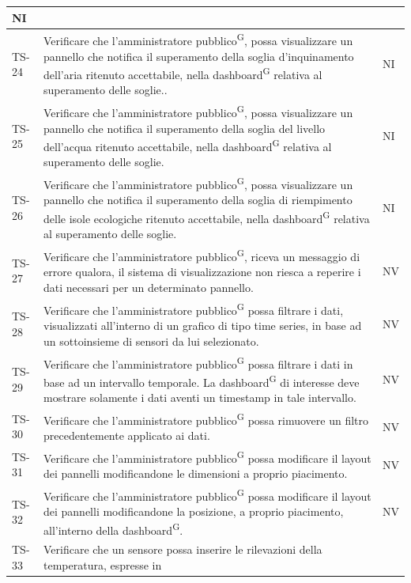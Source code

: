 \documentclass[8pt]{article}
\newcommand{\glossterm}[1]{#1\textsuperscript{G}} %
\begin{document}
\begin{longtable}{|>{\centering}p{2cm}|>{\RaggedRight}m{12cm}|>{\centering\arraybackslash}p{2cm}|}
    NI \\
    \hline
    TS-24 & Verificare che l’\glossterm{amministratore pubblico}, possa visualizzare un pannello che notifica il superamento della soglia d'inquinamento dell'aria ritenuto accettabile, nella \glossterm{dashboard} relativa al superamento delle soglie.. &
    NI \\
    \hline
    TS-25 & Verificare che l’\glossterm{amministratore pubblico}, possa visualizzare un pannello che notifica il superamento della soglia del livello dell'acqua ritenuto accettabile, nella \glossterm{dashboard} relativa al superamento delle soglie. &
    NI \\
    \hline
    TS-26 & Verificare che l’\glossterm{amministratore pubblico}, possa visualizzare un pannello che notifica il superamento della soglia di riempimento delle isole ecologiche ritenuto accettabile, nella \glossterm{dashboard} relativa al superamento delle soglie. &
    NI \\
    \hline
    TS-27 & Verificare che l’\glossterm{amministratore pubblico}, riceva un messaggio di errore qualora, il
    sistema di visualizzazione non riesca a reperire i dati necessari per un determinato pannello. &
    NV \\
    \hline
    TS-28 & Verificare che l’\glossterm{amministratore pubblico} possa filtrare i dati, visualizzati
    all’interno di un grafico di tipo time series, in base ad un sottoinsieme di sensori da lui
    selezionato. & NV \\
    \hline
    TS-29 & Verificare che l’\glossterm{amministratore pubblico} possa filtrare i dati in base ad un intervallo temporale. La \glossterm{dashboard} di interesse deve mostrare solamente i dati aventi un timestamp in tale intervallo.
    & NV\\
    \hline
    TS-30 & Verificare che l’\glossterm{amministratore pubblico} possa rimuovere un filtro precedentemente applicato ai dati.
    & NV\\
    \hline
    TS-31 & Verificare che l’\glossterm{amministratore pubblico} possa modificare il layout dei pannelli modificandone le dimensioni a proprio piacimento.
    & NV\\
    \hline
    TS-32 & Verificare che l’\glossterm{amministratore pubblico} possa modificare il layout dei pannelli modificandone la posizione, a proprio piacimento, all'interno della \glossterm{dashboard}.
    & NV\\
    \hline
    TS-33 & Verificare che un sensore possa inserire le rilevazioni della temperatura, espresse in

\end{longtable}
\end{document}

